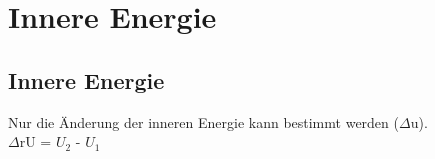 \section{Innere Energie} \label{sec:innere_energie}

\subsection{Innere Energie}
Nur die Änderung der inneren Energie kann bestimmt werden ($\Delta$u). \\
$\Delta$rU = $U_2$ - $U_1$

